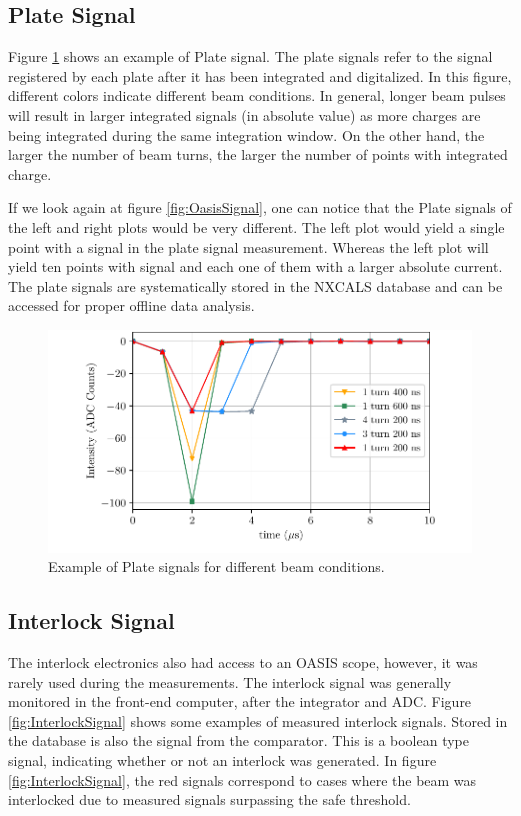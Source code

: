 \subsection{Plate Signal}

Figure \ref{fig:PlateSignal} shows an example of Plate signal. The plate signals refer to the signal registered by each plate after it has been integrated and digitalized. In this figure, different colors indicate different beam conditions. In general, longer beam pulses will result in larger integrated signals (in absolute value) as more charges are being integrated during the same integration window. On the other hand, the larger the number of beam turns, the larger the number of points with integrated charge. 

If we look again at figure \ref{fig:OasisSignal}, one can notice that the Plate signals of the left and right plots would be very different. The left plot would yield a single point with a signal in the plate signal measurement. Whereas the left plot will yield ten points with signal and each one of them with a larger absolute current. The plate signals are systematically stored in the NXCALS database and can be accessed for proper offline data analysis.

\begin{figure}[h]
    \centering
    \includegraphics[width=1.0\columnwidth]{Figure_PlateSignal/PlateSignal.pdf}
    \caption{Example of Plate signals for different beam conditions.}
    \label{fig:PlateSignal}
\end{figure}

\subsection{Interlock Signal}

The interlock electronics also had access to an OASIS scope, however, it was rarely used during the measurements. The interlock signal was generally monitored in the front-end computer, after the integrator and ADC. Figure \ref{fig:InterlockSignal} shows some examples of measured interlock signals. Stored in the database is also the signal from the comparator. This is a boolean type signal, indicating whether or not an interlock was generated. In figure \ref{fig:InterlockSignal}, the red signals correspond to cases where the beam was interlocked due to measured signals surpassing the safe threshold. 

